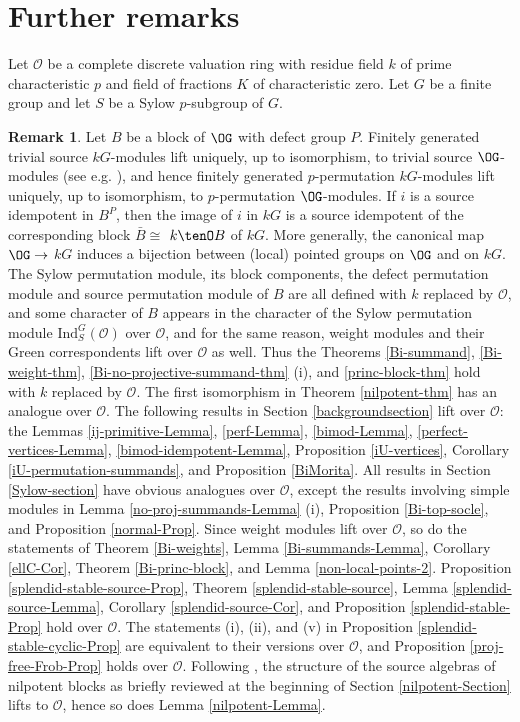 \documentclass{amsart}
\theoremstyle{plain}\newtheorem{Theorem}{Theorem}[section]
\theoremstyle{plain}\newtheorem{Conjecture}[Theorem]{Conjecture}
\theoremstyle{plain}\newtheorem{Corollary}[Theorem]{Corollary}
\theoremstyle{plain}\newtheorem{Lemma}[Theorem]{Lemma}
\theoremstyle{plain}\newtheorem{Proposition}[Theorem]{Proposition}
\theoremstyle{definition}\newtheorem{Definition}[Theorem]{Definition}
\theoremstyle{definition}\newtheorem{Example}[Theorem]{Example}
\theoremstyle{definition}\newtheorem{Examples}[Theorem]{Examples}
\theoremstyle{definition}\newtheorem{Exercise}[Theorem]{Exercise}
\theoremstyle{definition}\newtheorem{Notation}[Theorem]{Notation}
\theoremstyle{definition}\newtheorem{Remark}[Theorem]{Remark}
\theoremstyle{definition}\newtheorem{Remarks}[Theorem]{Remarks}
\theoremstyle{plain}\newtheorem{Statement}[Theorem]{}
\def\CO{{\mathcal{O}}}    \def\OPE{{\mathcal{O}(P\rtimes E)}}
\def\Ind{\mathrm{Ind}}    \def\tenC{\otimes_C}
\begin{document}
\section{Further remarks}
 Let $\CO$ be a complete discrete valuation ring with
residue field $k$ of prime characteristic $p$ and field of fractions $K$ of
characteristic zero.   Let $G$ be a finite group and let $S$ be a Sylow $p$-subgroup 
of $G$.

\begin{Remark} \label{O-Remark}
Let $B$ be a block of $\OG$ with defect group $P$.
Finitely generated  trivial source $kG$-modules lift uniquely, up to isomorphism, 
to trivial source  $\OG$-modules (see e.g. \cite[Theorem 5.10.2]{LiBookI}),
and hence finitely generated $p$-permutation $kG$-modules lift uniquely,
up to isomorphism, to $p$-permutation $\OG$-modules.
If $i$ is a source idempotent in $B^P$, then the image of $i$ in $kG$ is a source
idempotent of the corresponding block $\bar B\cong$ $k\tenO B$ of $kG$.
More generally, the canonical map $\OG\to$ $kG$ induces a bijection between
(local) pointed groups on $\OG$ and on $kG$.
The Sylow permutation module, its block components, the defect
permutation module and source permutation module of $B$ are all defined
with $k$ replaced by $\CO$, and some character of $B$ appears in 
the character of the Sylow permutation module $\Ind^G_S(\CO)$ over $\CO$,
and for the same reason, weight modules and their Green correspondents lift 
over $\CO$ as well. Thus the Theorems \ref{Bi-summand}, \ref{Bi-weight-thm},
\ref{Bi-no-projective-summand-thm} (i), 
 and \ref{princ-block-thm}
hold with $k$ replaced by $\CO$.  The first isomorphism in Theorem
\ref{nilpotent-thm} has an analogue over $\CO$.
The following results in Section \ref{backgroundsection}
lift  over $\CO$: 
the Lemmas \ref{ij-primitive-Lemma}, \ref{perf-Lemma}, 
\ref{bimod-Lemma}, \ref{perfect-vertices-Lemma},
 \ref{bimod-idempotent-Lemma},
Proposition \ref{iU-vertices}, Corollary \ref{iU-permutation-summands},
and Proposition \ref{BiMorita}.
All results in Section \ref{Sylow-section} have obvious analogues over $\CO$, except
the results involving simple modules  in Lemma \ref{no-proj-summands-Lemma} (i), 
Proposition \ref{Bi-top-socle},  and Proposition \ref{normal-Prop}. 
Since weight modules lift over $\CO$, so do the statements of 
Theorem \ref{Bi-weights}, Lemma \ref{Bi-summands-Lemma}, 
Corollary \ref{ellC-Cor}, Theorem \ref{Bi-princ-block},
and Lemma \ref{non-local-points-2}.
Proposition \ref{splendid-stable-source-Prop},
Theorem \ref{splendid-stable-source}, Lemma \ref{splendid-source-Lemma},
Corollary \ref{splendid-source-Cor}, 
and Proposition  \ref{splendid-stable-Prop} hold over $\CO$.
The statements (i), (ii), and (v) in Proposition \ref{splendid-stable-cyclic-Prop} 
are equivalent to their versions over $\CO$,
and Proposition \ref{proj-free-Frob-Prop} holds over $\CO$.
Following \cite{Punil}, the structure of the source algebras of nilpotent blocks 
as briefly reviewed at the beginning of Section \ref{nilpotent-Section} lifts
to $\CO$, hence so does  Lemma \ref{nilpotent-Lemma}. 
\end{Remark}
\end{document}
